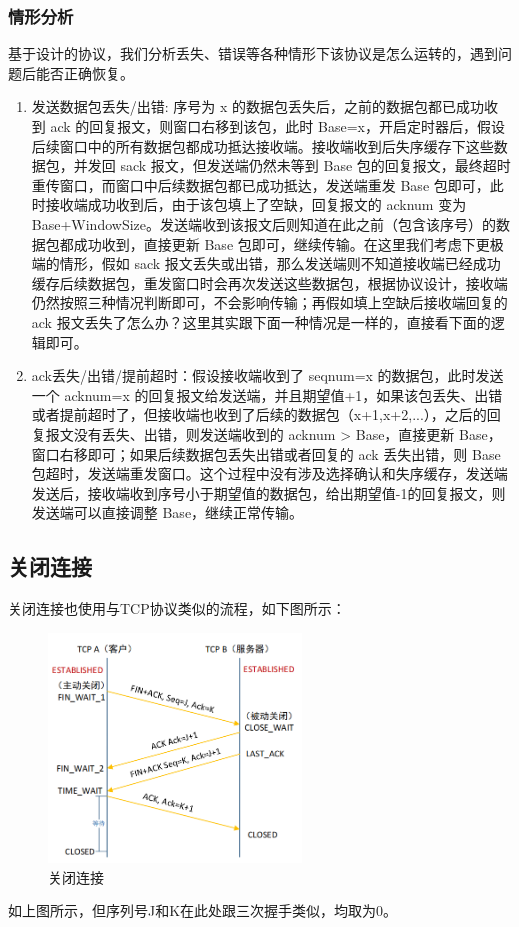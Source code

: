 \documentclass[UTF8,a4paper,10pt]{ctexart}
\begin{document}
\subsubsection{情形分析}
基于设计的协议，我们分析丢失、错误等各种情形下该协议是怎么运转的，遇到问题后能否正确恢复。
\begin{enumerate}
    \item 发送数据包丢失/出错: 序号为 x 的数据包丢失后，之前的数据包都已成功收到 ack 的回复报文，则窗口右移到该包，此时 Base=x，开启定时器后，假设后续窗口中的所有数据包都成功抵达接收端。接收端收到后失序缓存下这些数据包，并发回 sack 报文，但发送端仍然未等到 Base 包的回复报文，最终超时重传窗口，而窗口中后续数据包都已成功抵达，发送端重发 Base 包即可，此时接收端成功收到后，由于该包填上了空缺，回复报文的 acknum 变为 Base+WindowSize。发送端收到该报文后则知道在此之前（包含该序号）的数据包都成功收到，直接更新 Base 包即可，继续传输。在这里我们考虑下更极端的情形，假如 sack 报文丢失或出错，那么发送端则不知道接收端已经成功缓存后续数据包，重发窗口时会再次发送这些数据包，根据协议设计，接收端仍然按照三种情况判断即可，不会影响传输；再假如填上空缺后接收端回复的 ack 报文丢失了怎么办？这里其实跟下面一种情况是一样的，直接看下面的逻辑即可。
    \item ack丢失/出错/提前超时：假设接收端收到了 seqnum=x 的数据包，此时发送一个 acknum=x 的回复报文给发送端，并且期望值+1，如果该包丢失、出错或者提前超时了，但接收端也收到了后续的数据包（x+1,x+2,...），之后的回复报文没有丢失、出错，则发送端收到的 acknum > Base，直接更新 Base，窗口右移即可；如果后续数据包丢失出错或者回复的 ack 丢失出错，则 Base 包超时，发送端重发窗口。这个过程中没有涉及选择确认和失序缓存，发送端发送后，接收端收到序号小于期望值的数据包，给出期望值-1的回复报文，则发送端可以直接调整 Base，继续正常传输。
\end{enumerate}

\subsection{关闭连接}
关闭连接也使用与TCP协议类似的流程，如下图所示：
\begin{figure}[H]
    \centering
\includegraphics[width=0.6\textwidth]{img/关闭连接.png}
    \caption{关闭连接}
\end{figure}
如上图所示，但序列号J和K在此处跟三次握手类似，均取为0。
\end{document}
